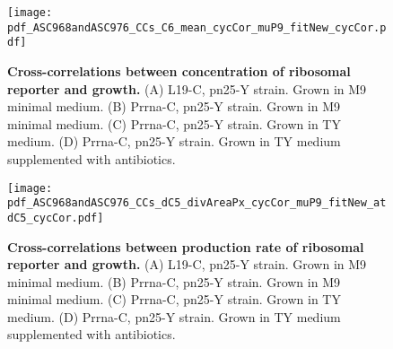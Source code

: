 \begin{figure}
    \centering
    \texttt{[image: pdf\_ASC968andASC976\_CCs\_C6\_mean\_cycCor\_muP9\_fitNew\_cycCor.pdf]}
    \caption{ 
        \textbf{Cross-correlations between concentration of ribosomal reporter and growth.}
        (A) L19-C, pn25-Y strain. Grown in M9 minimal medium.
        (B) Prrna-C, pn25-Y strain. Grown in M9 minimal medium.
        (C) Prrna-C, pn25-Y strain. Grown in TY medium.
        (D) Prrna-C, pn25-Y strain. Grown in TY medium supplemented with antibiotics.
    }
    \label{fig:ribo:CCsEmuYRibo}
\end{figure}

\begin{figure}
    \centering
    \texttt{[image: pdf\_ASC968andASC976\_CCs\_dC5\_divAreaPx\_cycCor\_muP9\_fitNew\_atdC5\_cycCor.pdf]}
    \caption{ 
        \textbf{Cross-correlations between production rate of ribosomal reporter and growth.}
        (A) L19-C, pn25-Y strain. Grown in M9 minimal medium.
        (B) Prrna-C, pn25-Y strain. Grown in M9 minimal medium.
        (C) Prrna-C, pn25-Y strain. Grown in TY medium.
        (D) Prrna-C, pn25-Y strain. Grown in TY medium supplemented with antibiotics.
    }
    \label{fig:ribo:CCsPmuYRibo}
\end{figure}



